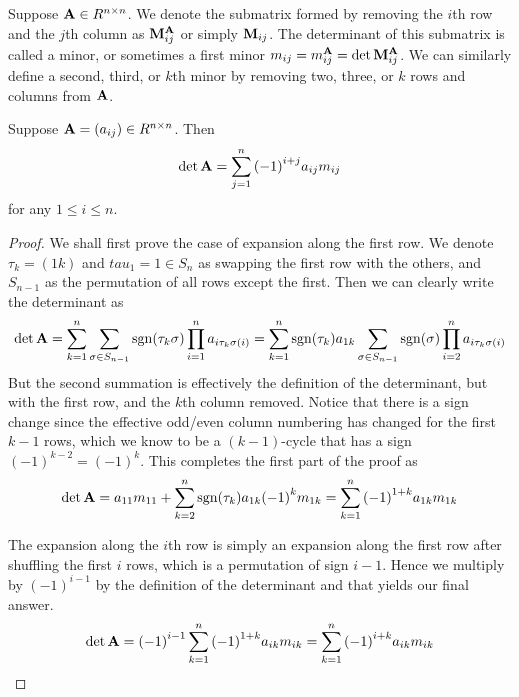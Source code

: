 \begin{definition}
    Suppose \(\vb{A} \in R^{n \times n}\).
    We denote the submatrix formed
    by removing the \(i\)th row and the \(j\)th column
    as \(\vb{M}_{ij}^{\vb{A}}\) or simply \(\vb{M}_{ij}\).
    The determinant of this submatrix is called a minor,
    or sometimes a first minor
    \(m_{ij} = m_{ij}^{\vb{A}} = \det\vb{M}_{ij}^{\vb{A}}\).
    We can similarly define a second, third, or \(k\)th minor
    by removing two, three, or \(k\) rows and columns from \(\vb{A}\).
\end{definition}
\begin{theorem}\label{thm:laplace-expansion-det}
    Suppose \(\vb{A} = (a_{ij}) \in R^{n \times n}\).
    Then
    \begin{equation*}
        \det\vb{A} = \sum_{j=1}^n {(-1)}^{i+j} a_{ij} m_{ij}
    \end{equation*}
    for any \(1 \leq i \leq n\).
\end{theorem}
\begin{proof}
    We shall first prove the case of expansion along the first row.
    We denote \(\tau_k = (1k)\) and \(tau_1 = 1 \in S_n\)
    as swapping the first row with the others,
    and \(S_{n-1}\) as the permutation of all rows except the first.
    Then we can clearly write the determinant as
    \begin{equation*}
        \det\vb{A} = \sum_{k=1}^n \sum_{\sigma \in S_{n-1}} \operatorname{sgn}(\tau_k \sigma)
        \prod_{i=1}^n a_{i\tau_k\sigma(i)}
        = \sum_{k=1}^n \operatorname{sgn}(\tau_k) a_{1k} \sum_{\sigma \in S_{n-1}} \operatorname{sgn}(\sigma)
        \prod_{i=2}^n a_{i\tau_k\sigma(i)}
    \end{equation*}
    But the second summation is effectively the definition of the determinant,
    but with the first row, and the \(k\)th column removed.
    Notice that there is a sign change
    since the effective odd/even column numbering has changed
    for the first \(k-1\) rows,
    which we know to be a \((k-1)\)-cycle
    that has a sign \({(-1)}^{k-2} = {(-1)}^k\).
    This completes the first part of the proof as
    \begin{equation*}
        \det\vb{A} = a_{11}m_{11}
        + \sum_{k=2}^n \operatorname{sgn}(\tau_k) a_{1k} {(-1)}^k m_{1k}
        = \sum_{k=1}^n {(-1)}^{1+k} a_{1k} m_{1k}
    \end{equation*}
    
    The expansion along the \(i\)th row is simply
    an expansion along the first row after shuffling the first \(i\) rows,
    which is a permutation of sign \(i-1\).
    Hence we multiply by \({(-1)}^{i-1}\) by the definition of the determinant
    and that yields our final answer.
    \begin{equation*}
        \det\vb{A} = {(-1)}^{i-1} \sum_{k=1}^n {(-1)}^{1+k} a_{ik} m_{ik}
        = \sum_{k=1}^n {(-1)}^{i+k} a_{ik} m_{ik}
    \end{equation*}
\end{proof}

